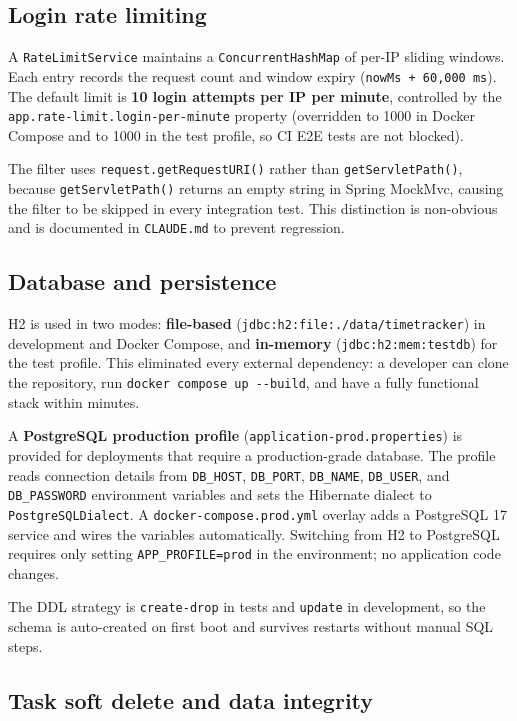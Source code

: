 \documentclass[a4paper, 12pt]{article}
\begin{document}
\subsection{Login rate limiting}

A \texttt{RateLimitService} maintains a \texttt{ConcurrentHashMap} of per-IP sliding windows.
Each entry records the request count and window expiry (\texttt{nowMs + 60,000~ms}). The
default limit is \textbf{10 login attempts per IP per minute}, controlled by the
\texttt{app.rate-limit.login-per-minute} property (overridden to 1000 in Docker Compose and
to 1000 in the test profile, so CI E2E tests are not blocked).

The filter uses \texttt{request.getRequestURI()} rather than \texttt{getServletPath()},
because \texttt{getServletPath()} returns an empty string in Spring MockMvc, causing the
filter to be skipped in every integration test. This distinction is non-obvious and is
documented in \texttt{CLAUDE.md} to prevent regression.

\subsection{Database and persistence}

H2 is used in two modes: \textbf{file-based} (\texttt{jdbc:h2:file:./data/timetracker}) in
development and Docker Compose, and \textbf{in-memory} (\texttt{jdbc:h2:mem:testdb}) for the
test profile. This eliminated every external dependency: a developer can clone the repository,
run \texttt{docker compose up -{}-build}, and have a fully functional stack within minutes.

A \textbf{PostgreSQL production profile} (\texttt{application-prod.properties}) is provided
for deployments that require a production-grade database. The profile reads connection details
from \texttt{DB\_HOST}, \texttt{DB\_PORT}, \texttt{DB\_NAME}, \texttt{DB\_USER}, and
\texttt{DB\_PASSWORD} environment variables and sets the Hibernate dialect to
\texttt{PostgreSQLDialect}. A \texttt{docker-compose.prod.yml} overlay adds a PostgreSQL 17
service and wires the variables automatically. Switching from H2 to PostgreSQL requires only
setting \texttt{APP\_PROFILE=prod} in the environment; no application code changes.

The DDL strategy is \texttt{create-drop} in tests and \texttt{update} in development, so the
schema is auto-created on first boot and survives restarts without manual SQL steps.

\subsection{Task soft delete and data integrity}
\end{document}
